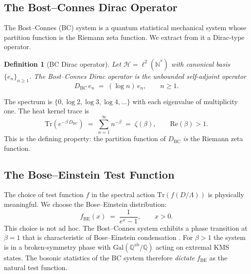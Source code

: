 \documentclass[11pt,a4paper]{article}
\newtheorem{definition}[theorem]{Definition}
\begin{document}
\subsection{The Bost--Connes Dirac Operator}
\label{sec:DBC}

The Bost--Connes (BC) system \cite{BostConnes1995} is a quantum statistical
mechanical system whose partition function is the Riemann zeta function.
We extract from it a Dirac-type operator.

\begin{definition}[BC Dirac operator]
Let $\mathcal{H} = \ell^2(\mathbb{N}^*)$ with canonical basis
$\{e_n\}_{n \geq 1}$. The \emph{Bost--Connes Dirac operator} is the
unbounded self-adjoint operator
\[
  D_{\mathrm{BC}}\, e_n \;=\; (\log n)\, e_n,
  \qquad n \geq 1.
\]
\end{definition}

The spectrum is $\{0, \log 2, \log 3, \log 4, \ldots\}$ with each eigenvalue
of multiplicity one. The heat kernel trace is
\begin{equation}\label{eq:partition}
  \mathrm{Tr}\!\left(e^{-\beta\, D_{\mathrm{BC}}}\right)
  \;=\; \sum_{n=1}^{\infty} n^{-\beta}
  \;=\; \zeta(\beta),
  \qquad \mathrm{Re}(\beta) > 1.
\end{equation}
This is the defining property: the partition function of $D_{\mathrm{BC}}$
\emph{is} the Riemann zeta function.

\subsection{The Bose--Einstein Test Function}
\label{sec:fBE}

The choice of test function $f$ in the spectral action $\mathrm{Tr}(f(D/\Lambda))$
is physically meaningful. We choose the Bose--Einstein distribution:
\begin{equation}\label{eq:fBE}
  f_{\mathrm{BE}}(x) \;=\; \frac{1}{e^{x} - 1},
  \qquad x > 0.
\end{equation}
This choice is not ad hoc. The Bost--Connes system exhibits a phase transition
at $\beta = 1$ that is characteristic of Bose--Einstein condensation
\cite{BostConnes1995, ConnesMarcolli2008}. For $\beta > 1$ the system is in a
broken-symmetry phase with $\mathrm{Gal}(\mathbb{Q}^{\mathrm{ab}}/\mathbb{Q})$
acting on extremal KMS states. The bosonic statistics of the BC system
therefore \emph{dictate} $f_{\mathrm{BE}}$ as the natural test function.
\end{document}
